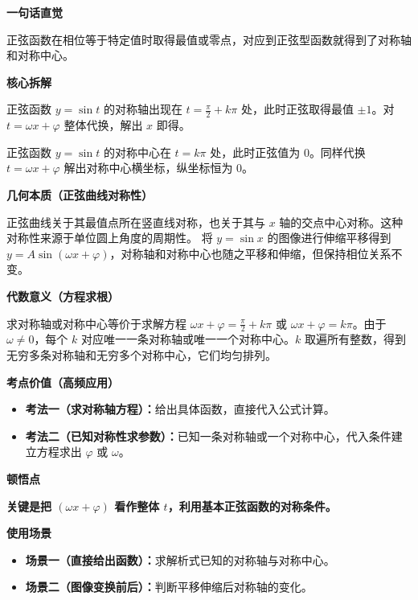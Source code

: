 \begin{explanationbox}
	\textbf{\textcolor{CExplanation}{一句话直觉}}

	正弦函数在相位等于特定值时取得最值或零点，对应到正弦型函数就得到了对称轴和对称中心。

	\medskip
	\textbf{\textcolor{CExplanation}{核心拆解}}
	\begin{description}[style=nextline, leftmargin=2.8em, labelsep=0.5em, itemsep=0.45em]
		\item[\textbf{要点一（对称轴条件）：}] 正弦函数 $y=\sin t$ 的对称轴出现在 $t = \frac{\pi}{2}+k\pi$ 处，此时正弦取得最值 $\pm1$。对 $t=\omega x+\varphi$ 整体代换，解出 $x$ 即得。
		\item[\textbf{要点二（对称中心条件）：}] 正弦函数 $y=\sin t$ 的对称中心在 $t=k\pi$ 处，此时正弦值为 $0$。同样代换 $t=\omega x+\varphi$ 解出对称中心横坐标，纵坐标恒为 $0$。
	\end{description}

	\medskip
	\textbf{\textcolor{CExplanation}{几何本质（正弦曲线对称性）}}

	正弦曲线关于其最值点所在竖直线对称，也关于其与 $x$ 轴的交点中心对称。这种对称性来源于单位圆上角度的周期性。
	将 $y=\sin x$ 的图像进行伸缩平移得到 $y=A\sin(\omega x+\varphi)$，对称轴和对称中心也随之平移和伸缩，但保持相位关系不变。

	\medskip
	\textbf{\textcolor{CExplanation}{代数意义（方程求根）}}

	求对称轴或对称中心等价于求解方程 $\omega x+\varphi = \frac{\pi}{2}+k\pi$ 或 $\omega x+\varphi = k\pi$。由于 $\omega\neq 0$，每个 $k$ 对应唯一一条对称轴或唯一一个对称中心。$k$ 取遍所有整数，得到无穷多条对称轴和无穷多个对称中心，它们均匀排列。

	\medskip
	\textbf{\textcolor{CExplanation}{考点价值（高频应用）}}
	\begin{itemize}[leftmargin=*, itemsep=0.5em, topsep=0.4em]
		\item \textbf{考法一（求对称轴方程）：}给出具体函数，直接代入公式计算。
		\item \textbf{考法二（已知对称性求参数）：}已知一条对称轴或一个对称中心，代入条件建立方程求出 $\varphi$ 或 $\omega$。
	\end{itemize}

	\medskip
	\textbf{\textcolor{CExplanation}{顿悟点}}

	\textbf{关键是把 $(\omega x+\varphi)$ 看作整体 $t$，利用基本正弦函数的对称条件。}

	\medskip
	\textbf{\textcolor{CExplanation}{使用场景}}
	\begin{itemize}[leftmargin=*, itemsep=0.5em, topsep=0.4em]
		\item \textbf{场景一（直接给出函数）：}求解析式已知的对称轴与对称中心。
		\item \textbf{场景二（图像变换前后）：}判断平移伸缩后对称轴的变化。
	\end{itemize}
\end{explanationbox}
